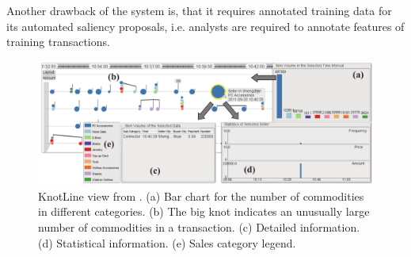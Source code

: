 \documentclass[electronic]{vgtc}             %
\begin{document}
Another drawback of the system is, that it requires annotated training data for its automated saliency proposals, i.e. analysts are required to annotate features of training transactions. 

\begin{figure}[htb]
	\centering
	\includegraphics[width=\columnwidth]{KnotLines}
	\caption{KnotLine view from \cite{Xie:2014}. (a) Bar chart for the number of commodities in different categories. (b) The big knot indicates an unusually large number of commodities in a transaction. (c) Detailed information. (d) Statistical information. (e) Sales category legend.
	}
	\label{fig:knotlines}
\end{figure}
\end{document}
